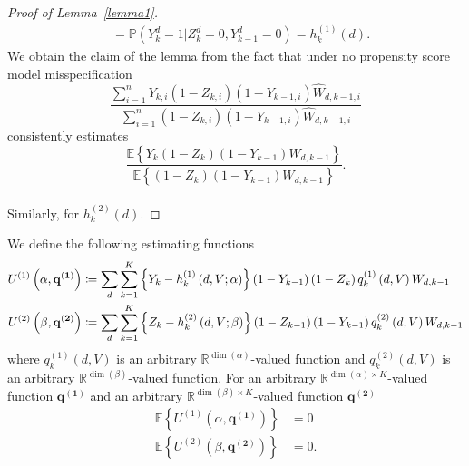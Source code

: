 \documentclass[12pt]{article}
\begin{document}
\begin{proof}[Proof of Lemma~\ref{lemma1}]
\begin{align*}
&= \mathbb{P} \left( Y_{k}^d = 1 \vert  Z_{k}^d = 0, Y_{k-1}^d = 0 \right) = h_k^{(1)}(d).
\end{align*}
We obtain the claim of the lemma from the fact that under no propensity score model misspecification 
\begin{equation*}
\frac{\sum_{i=1}^n Y_{k,i} \left( 1 - Z_{k,i} \right) \left( 1 - Y_{k-1,i} \right) \hat{W}_{d,k-1,i}}{\sum_{i=1}^n  \left( 1 - Z_{k,i} \right) \left( 1 - Y_{k-1,i} \right) \hat{W}_{d,k-1,i}}
\end{equation*}
consistently estimates
\begin{equation*}
\frac{\mathbb{E} \left\lbrace Y_{k} \left( 1 - Z_{k} \right) \left( 1 - Y_{k-1} \right) W_{d,k-1} \right\rbrace}{\mathbb{E} \left\lbrace \left( 1 - Z_{k} \right) \left( 1 - Y_{k-1} \right) W_{d,k-1} \right\rbrace}.
\end{equation*}
\\
Similarly, for $h_k^{(2)}(d)$. 
\end{proof}

\begin{lemma}
\label{lemma3}
We define the following estimating functions
\begin{align*}
U^{(1)} \left( \alpha, \bf{q^{(1)} } \right) & \coloneqq \sum_d \sum_{k=1}^{K} \left\lbrace Y_{k} - h_{k}^{(1)} \left(d, V; \alpha \right) \right\rbrace \left( 1 - Y_{k-1} \right) \left( 1 - Z_{k} \right) q_k^{(1)}  \left(d, V \right) W_{d,k-1} \\
U^{(2)} \left( \beta, \bf{q^{(2)} } \right) & \coloneqq \sum_d \sum_{k=1}^{K} \left\lbrace Z_{k} - h_{k}^{(2)} \left(d, V; \beta \right) \right\rbrace \left( 1 - Z_{k-1} \right) \left( 1 - Y_{k-1} \right) q_k^{(2)}  \left(d, V \right) W_{d,k-1}
\end{align*}
where $q_k^{(1)}  \left(d, V \right)$ is an arbitrary $\mathbb{R}^{\dim(\alpha)}$-valued function and $q_k^{(2)}  \left(d, V \right)$ is an arbitrary $\mathbb{R}^{\dim(\beta)}$-valued function. For an arbitrary $\mathbb{R}^{\dim(\alpha) \times K}$-valued function $\mathbf{q^{(1)}}$  and an arbitrary $\mathbb{R}^{\dim(\beta) \times K}$-valued function $\mathbf{q^{(2)}}$ 
\begin{align*}
\mathbb{E} \left\lbrace U^{(1)}  \left( \alpha, \mathbf{q^{(1)} } \right) \right\rbrace &= 0 \\
\mathbb{E} \left\lbrace U^{(2)}  \left( \beta, \mathbf{q^{(2)} } \right) \right\rbrace &= 0.
\end{align*}
\end{lemma}
\end{document}
